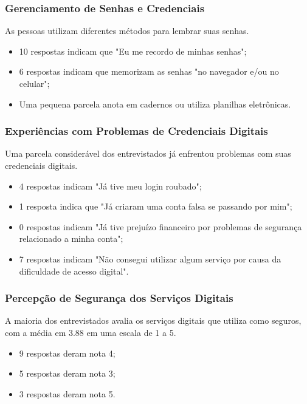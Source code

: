 \documentclass[12pt]{article}
\begin{document}
\subsubsection{Gerenciamento de Senhas e Credenciais}

As pessoas utilizam diferentes métodos para lembrar suas senhas.

\begin{itemize}
  \item 10 respostas indicam que "Eu me recordo de minhas senhas";
  \item 6 respostas indicam que memorizam as senhas "no navegador e/ou no celular";
  \item Uma pequena parcela anota em cadernos ou utiliza planilhas eletrônicas.
\end{itemize}

\subsubsection{Experiências com Problemas de Credenciais Digitais}

Uma parcela considerável dos entrevistados já enfrentou problemas com suas
credenciais digitais.

\begin{itemize}
  \item 4 respostas indicam "Já tive meu login roubado";
  \item 1 resposta indica que "Já criaram uma conta falsa se passando por mim";
  \item 0 respostas indicam "Já tive prejuízo financeiro por problemas de segurança
  relacionado a minha conta";
  \item 7 respostas indicam "Não consegui utilizar algum serviço por causa da
  dificuldade de acesso digital".
\end{itemize}

\subsubsection{Percepção de Segurança dos Serviços Digitais}

A maioria dos entrevistados avalia os serviços digitais que utiliza como seguros,
com a média em 3.88 em uma escala de 1 a 5.

\begin{itemize}
  \item 9 respostas deram nota 4;
  \item 5 respostas deram nota 3;
  \item 3 respostas deram nota 5.
\end{itemize}
\end{document}
